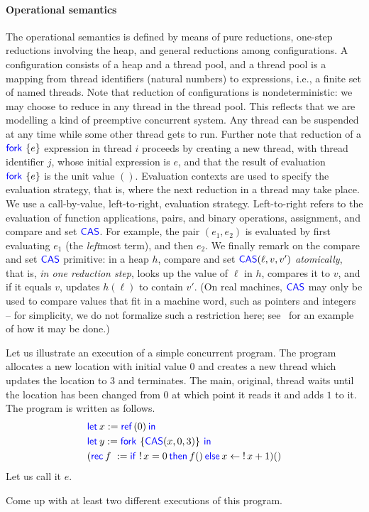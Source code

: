 \paragraph*{Operational semantics}
The operational semantics is defined by means of pure reductions,
one-step reductions involving the heap, and general reductions 
among configurations.  
A configuration consists of a heap and a thread
pool, and a thread pool is a mapping from thread identifiers (natural
numbers) to expressions, i.e., a finite set of named threads.
Note that reduction of configurations is
nondeterministic: we may choose to reduce in any thread
in the thread pool.
This reflects that we are modelling a kind of preemptive concurrent system.
Any thread can be suspended at any time while some other thread gets to run.
Further note that reduction of a $\Fork{e}$ expression in thread $i$ 
proceeds by creating a new thread, with thread identifier $j$, whose initial expression is $e$,
and that the result of evaluation $\Fork{e}$ is the unit value $()$.
Evaluation contexts are used to specify the evaluation strategy, that is,
where the next reduction in a
thread may take place.  We use a call-by-value, left-to-right,
evaluation strategy.
Left-to-right refers to the evaluation of function applications, pairs, and binary operations, assignment, and compare and set $\textsf{\color{blue} CAS}$.
For example, the pair $(e_1,e_2)$ is evaluated by first evaluating $e_1$ (the \emph{left}most term), and then $e_2$.
We finally remark on the compare and set  $\textsf{\color{blue} CAS}$ primitive: in 
a heap $h$, compare and set $\textsf{\color{blue} CAS}(\ell,v,v')$ \emph{atomically},
that is, \emph{in one reduction step}, looks up the value of $\ell$ in
$h$, compares it to $v$, and if it equals $v$, updates $h(\ell)$ to
contain $v'$.
(On real machines, $\textsf{\color{blue} CAS}$ may only be used to compare values that fit
in a machine word, such as pointers and integers -- for simplicity, we
do not formalize such a restriction here; see~\cite{logrel-fcd} for
an example of how it may be done.)

Let us illustrate an execution of a simple concurrent program.
The program allocates a new location with initial value $0$ and creates a new thread which updates the location to $3$ and terminates.
The main, \ie{} original, thread waits until the location has been changed from $0$ at which point it reads it and adds $1$ to it.
The program is written as follows.
\begin{align*}
  &\Let x = \Ref(0) in\\
  &\Let y = \Fork{\CAS(x,0,3)} in\\
  &(\Rec{f} {} = \If \deref x = 0 then f \TT \Else x \gets \deref{x} + 1) \TT
\end{align*}
Let us call it $e$.
\begin{exercise}
  Come up with at least two different executions of this program.
\end{exercise}


